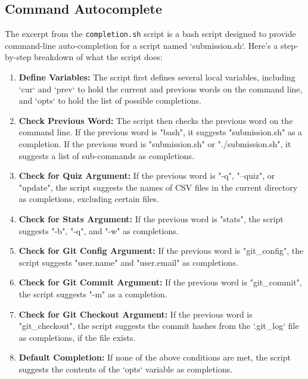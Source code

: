 \documentclass{article}
\begin{document}
\subsection{Command Autocomplete}
The excerpt from the \texttt{completion.sh} script is a bash script designed to provide command-line auto-completion for a script named `submission.sh`. Here's a step-by-step breakdown of what the script does:

\begin{enumerate}
    \item \textbf{Define Variables:} The script first defines several local variables, including `cur` and `prev` to hold the current and previous words on the command line, and `opts` to hold the list of possible completions.

    \item \textbf{Check Previous Word:} The script then checks the previous word on the command line. If the previous word is "bash", it suggests "submission.sh" as a completion. If the previous word is "submission.sh" or "./submission.sh", it suggests a list of sub-commands as completions.

    \item \textbf{Check for Quiz Argument:} If the previous word is "-q", "--quiz", or "update", the script suggests the names of CSV files in the current directory as completions, excluding certain files.

    \item \textbf{Check for Stats Argument:} If the previous word is "stats", the script suggests "-b", "-q", and "-w" as completions.

    \item \textbf{Check for Git Config Argument:} If the previous word is "git\_config", the script suggests "user.name" and "user.email" as completions.

    \item \textbf{Check for Git Commit Argument:} If the previous word is "git\_commit", the script suggests "-m" as a completion.

    \item \textbf{Check for Git Checkout Argument:} If the previous word is "git\_checkout", the script suggests the commit hashes from the `.git\_log` file as completions, if the file exists.

    \item \textbf{Default Completion:} If none of the above conditions are met, the script suggests the contents of the `opts` variable as completions.
\end{enumerate}
\end{document}
